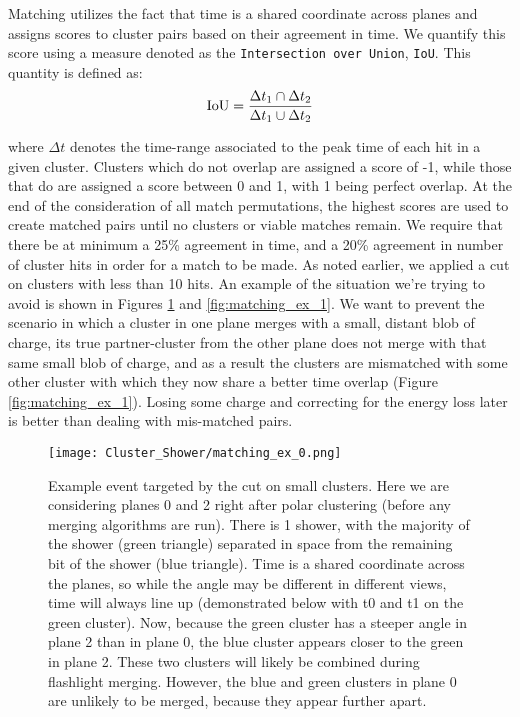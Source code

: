 \documentclass{article}
\begin{document}
\par Matching utilizes the fact that time is a shared coordinate across planes and assigns scores to cluster pairs based on their agreement in time. We quantify this score using a measure denoted as the \texttt{Intersection over Union}, \texttt{IoU}. This quantity is defined as:
\begin{equation}
  {\rm IoU} = \frac{ \Delta t_1 \cap \Delta t_2  }{ \Delta t_1 \cup \Delta t_2 }
\end{equation}

\noindent where $\Delta t$ denotes the time-range associated to the peak time of each hit in a given cluster.  Clusters which do not overlap are assigned a score of -1, while those that do are assigned a score between 0 and 1, with 1 being perfect overlap. At the end of the consideration of all match permutations, the highest scores are used to create matched pairs until no clusters or viable matches remain. We require that there be at minimum a 25\% agreement in time, and a 20\% agreement in number of cluster hits in order for a match to be made. As noted earlier, we applied a cut on clusters with less than 10 hits. An example of the situation we're trying to avoid is shown in Figures \ref{fig:matching_ex_0} and \ref{fig:matching_ex_1}.  We want to prevent the scenario in which a cluster in one plane merges with a small, distant blob of charge, its true partner-cluster from the other plane does not merge with that same small blob of charge, and as a result the clusters are mismatched with some other cluster with which they now share a better time overlap (Figure \ref{fig:matching_ex_1}). Losing some charge and correcting for the energy loss later is better than dealing with mis-matched pairs.

\begin{figure}[H]
\centering
\texttt{[image: Cluster\_Shower/matching\_ex\_0.png]}
\caption{Example event targeted by the cut on small clusters. Here we are considering planes 0 and 2 right after polar clustering (before any merging algorithms are run).  There is 1 shower, with the majority of the shower (green triangle) separated in space from the remaining bit of the shower (blue triangle).  Time is a shared coordinate across the planes, so while the angle may be different in different views, time will always line up (demonstrated below with t0 and t1 on the green cluster).  Now, because the green cluster has a steeper angle in plane 2 than in plane 0, the blue cluster appears closer to the green in plane 2.  These two clusters will likely be combined during flashlight merging.  However, the blue and green clusters in plane 0 are unlikely to be merged,  because they appear further apart. }
\label{fig:matching_ex_0}
\end{figure}
\end{document}
